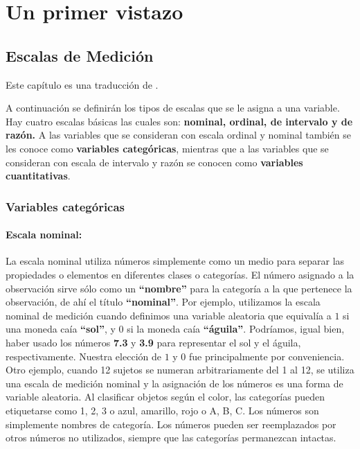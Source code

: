 \documentclass[
  a4paper,
  oneside,
  openany]{book}
\begin{document}
\hypertarget{part-un-primer-vistazo}{%
\part{Un primer vistazo}\label{part-un-primer-vistazo}}

\hypertarget{escalas-de-mediciuxf3n}{%
\chapter{Escalas de Medición}\label{escalas-de-mediciuxf3n}}

Este capítulo es una traducción de \citet{conover1998practical}.

A continuación se definirán los tipos de escalas que se le asigna a una variable. Hay cuatro escalas básicas las cuales son: \textbf{nominal, ordinal, de intervalo y de razón.} A las variables que se consideran con escala ordinal y nominal también se les conoce como \textbf{variables categóricas}, mientras que a las variables que se consideran con escala de intervalo y razón se conocen como \textbf{variables cuantitativas}.

\hypertarget{variables-categuxf3ricas}{%
\section{Variables categóricas}\label{variables-categuxf3ricas}}

\hypertarget{escala-nominal}{%
\subsection{Escala nominal:}\label{escala-nominal}}

La escala nominal utiliza números simplemente como un medio para separar las propiedades o elementos en diferentes clases o categorías. El número asignado a la observación sirve sólo como un \textbf{``nombre''} para la categoría a la que pertenece la observación, de ahí el título \textbf{``nominal''}. Por ejemplo, utilizamos la escala nominal de medición cuando definimos una variable aleatoria que equivalía a \(1\) si una moneda caía \textbf{``sol''}, y \(0\) si la moneda caía \textbf{``águila''}. Podríamos, igual bien, haber usado los números \textbf{7.3} y \textbf{3.9} para representar el sol y el águila, respectivamente. Nuestra elección de \(1\) y \(0\) fue principalmente por conveniencia.
Otro ejemplo, cuando 12 sujetos se numeran arbitrariamente del 1 al 12, se utiliza una escala de medición nominal y la asignación de los números es una forma de variable aleatoria. Al clasificar objetos según el color, las categorías pueden etiquetarse como 1, 2, 3 o azul, amarillo, rojo o A, B, C. Los números son simplemente nombres de categoría. Los números pueden ser reemplazados por otros números no utilizados, siempre que las categorías permanezcan intactas.
\end{document}
